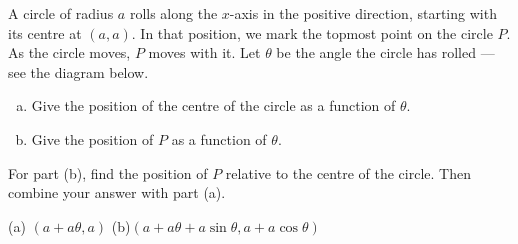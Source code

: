 \begin{question}\label{prob_s1.1_cycloid}

\begin{center}
\end{center}

A circle of radius $a$ rolls along the $x$-axis in the positive direction, starting with its centre at $(a,a)$. In that position, we mark the topmost point on the circle $P$. As the circle moves, $P$ moves with it. Let $\theta$ be  the angle the circle has rolled --- see the diagram below.
\begin{enumerate}[(a)]
\item Give the position of the centre of the circle as a function of $\theta$.
\item Give the position of $P$ as a function of $\theta$.
\end{enumerate}
\begin{center}
\end{center}

\end{question}
\begin{hint}
For part (b), find the position of $P$ relative to the centre of the circle. Then combine your answer with part (a).
\end{hint}
\begin{answer}
(a) $(a+a\theta,a)$\qquad
(b)$(a+a\theta+a\sin\theta,a+a\cos\theta)$
\end{answer}
